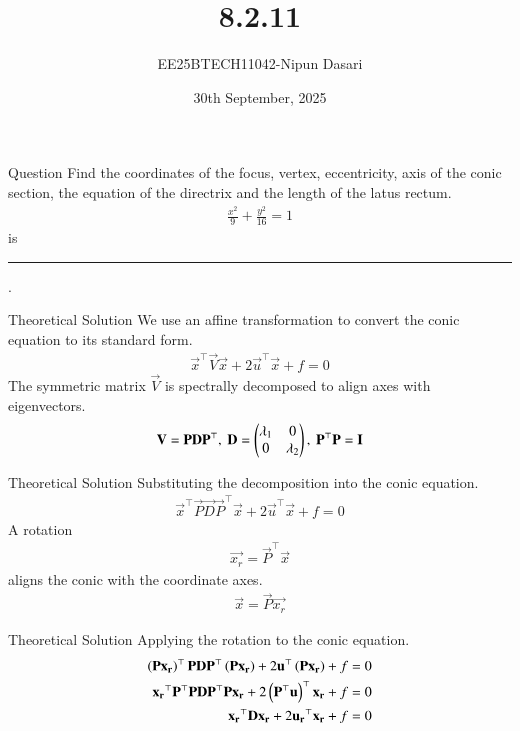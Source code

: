 \documentclass{beamer}
\title{8.2.11}
\date{30th September, 2025}
\author{EE25BTECH11042-Nipun Dasari}
\begin{document}
	
	\frame{\titlepage}
	\begin{frame}{Question}
		Find the coordinates of the focus, vertex, eccentricity, axis of the conic section, the equation of the directrix and the length of the latus rectum.
		\begin{align*}
			\frac{x^2}{9} + \frac{y^2}{16} = 1
		\end{align*}
		is \rule{2cm}{0.4pt}.
	\end{frame}
	
	\begin{frame}{Theoretical Solution}
		We use an affine transformation to convert the conic equation to its standard form.
		\begin{align*}
			\vec{x}^\top\vec{V}\vec{x} + 2\vec{u}^\top\vec{x} + f = 0
		\end{align*}
		The symmetric matrix $\vec{V}$ is spectrally decomposed to align axes with eigenvectors.
		\begin{align}
			\mathbf{V} = \mathbf{P}\mathbf{D}\mathbf{P}^\top, \text{ } \mathbf{D} = \begin{pmatrix}\lambda_1 & 0 \\ 0 & \lambda_2\end{pmatrix}, \text{ } \mathbf{P}^\top\mathbf{P} = \mathbf{I}
		\end{align}
	\end{frame}
	
	\begin{frame}{Theoretical Solution}
		Substituting the decomposition into the conic equation.
		\begin{align}
			\vec{x}^\top\vec{P}\vec{D}\vec{P}^\top\vec{x} + 2\vec{u}^\top\vec{x} + f = 0
		\end{align}
		A rotation
		\begin{align}
			\vec{x_r} = \vec{P}^\top\vec{x} 
		\end{align}
		aligns the conic with the coordinate axes.
		\begin{align}
			\vec{x} = \vec{P}\vec{x_r}
		\end{align}
	\end{frame}
	
	\begin{frame}{Theoretical Solution}
		Applying the rotation to the conic equation.
		\begin{align}
			\left(\mathbf{P}\mathbf{x_r}\right)^\top\mathbf{P}\mathbf{D}\mathbf{P}^\top\left(\mathbf{P}\mathbf{x_r}\right) + 2\mathbf{u}^\top\left(\mathbf{P}\mathbf{x_r}\right) + f &= 0 \\
			\mathbf{x_r}^\top\mathbf{P}^\top\mathbf{P}\mathbf{D}\mathbf{P}^\top\mathbf{P}\mathbf{x_r} + 2\left(\mathbf{P}^\top\mathbf{u}\right)^\top\mathbf{x_r} + f &= 0 \\
			\mathbf{x_r}^\top\mathbf{D}\mathbf{x_r} + 2\mathbf{u_r}^\top\mathbf{x_r} + f &= 0
		\end{align}
	\end{frame}
	
\end{document}
